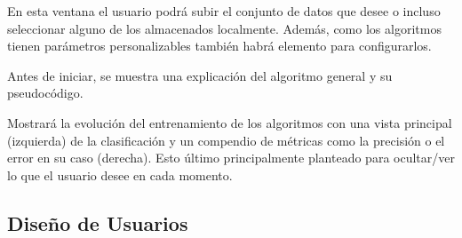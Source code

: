 En esta ventana el usuario podrá subir el conjunto de datos que desee o incluso
seleccionar alguno de los almacenados localmente. Además, como los algoritmos
tienen parámetros personalizables también habrá elemento para configurarlos.

Antes de iniciar, se muestra una explicación del algoritmo general y su
pseudocódigo.



Mostrará la evolución del entrenamiento de los algoritmos con una vista
principal (izquierda) de la clasificación y un compendio de métricas como la
precisión o el error en su caso (derecha). Esto último principalmente planteado
para ocultar/ver lo que el usuario desee en cada momento.

\subsection{Diseño de Usuarios}

